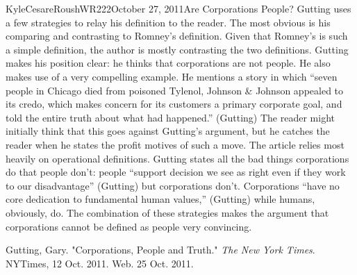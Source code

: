 \documentclass[12pt,letterpaper]{article}
\begin{document}
\begin{mla}{Kyle}{Cesare}{Roush}{WR222}{October 27, 2011}{Are Corporations
People?}
Gutting uses a few strategies to relay his definition to the reader.  The most
obvious is his comparing and contrasting to Romney's definition.  Given that
Romney's is such a simple definition, the author is mostly contrasting the two
definitions.  Gutting makes his position clear: he thinks that corporations are
not people.  He also makes use of a very compelling example.  He mentions a
story in which ``seven people in Chicago died from poisoned Tylenol, Johnson \&
Johnson appealed to its credo, which makes concern for its customers a primary
corporate goal, and told the entire truth about what had happened.'' (Gutting)
The reader might initially think that this goes against Gutting's argument, but
he catches the reader when he states the profit motives of such a move.  The
article relies most heavily on operational definitions.  Gutting states all the
bad things corporations do that people don't: people ``support decision we see
as right even if they work to our disadvantage'' (Gutting) but corporations
don't.  Corporations ``have no core dedication to fundamental human values,''
(Gutting) while humans, obviously, do.  The combination of these strategies
makes the argument that corporations cannot be defined as people very
convincing.


\begin{workscited}

\bibent Gutting, Gary. "Corporations, People and Truth." \emph{The New York
Times}. NYTimes, 12 Oct. 2011. Web. 25 Oct. 2011. 

\end{workscited}
\end{mla}
\end{document}
